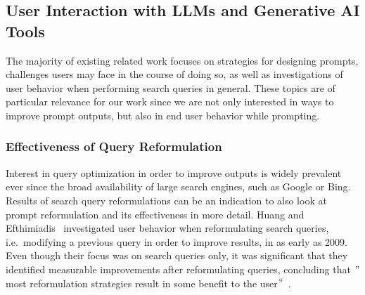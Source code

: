 
\subsection{User Interaction with LLMs and Generative AI Tools}
\label{subsec:user-interaction-with-llms-and-generative-ai-tools}
The majority of existing related work focuses on strategies for designing prompts,
challenges users may face in the course of doing so, as well as investigations of user behavior when
performing search queries in general.
These topics are of particular relevance for our work since we are not only interested in ways to
improve prompt outputs, but also in end user behavior while prompting.

\subsubsection{Effectiveness of Query Reformulation}
Interest in query optimization in order to improve outputs is widely prevalent ever since the broad
availability of large search engines, such as Google or Bing.
Results of search query reformulations can be an indication to also look at prompt reformulation
and its effectiveness in more detail.
Huang and Efthimiadis~\cite{huang_analyzing_2009} investigated user behavior when reformulating search
queries, i.e.\ modifying a previous query in order to improve results, in as early as 2009.
Even though their focus was on search queries only, it was significant that they identified
measurable improvements after reformulating queries, concluding that
\("\)most reformulation strategies result in some benefit to the user\("\)~\cite[p. 1]{huang_analyzing_2009}.


